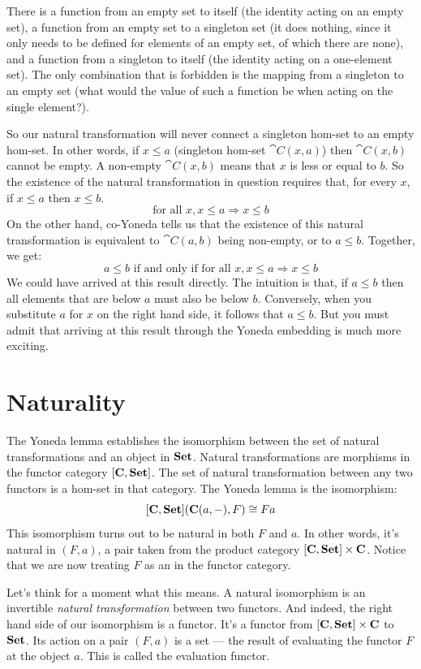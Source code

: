 There is a function from an empty set to itself (the identity acting on
an empty set), a function  from an empty set to a
singleton set (it does nothing, since it only needs to be defined for
elements of an empty set, of which there are none), and a function from
a singleton to itself (the identity acting on a one-element set). The
only combination that is forbidden is the mapping from a singleton to an
empty set (what would the value of such a function be when acting on the
single element?).

So our natural transformation will never connect a singleton hom-set to
an empty hom-set. In other words, if $x \leqslant a$
(singleton hom-set $\cat{C}(x, a)$) then $\cat{C}(x, b)$ cannot be
empty. A non-empty $\cat{C}(x, b)$ means that $x$ is less or
equal to $b$. So the existence of the natural transformation in
question requires that, for every $x$, if
$x \leqslant a$ then $x \leqslant b$.
\[\text{for all } x, x \leqslant a \Rightarrow x \leqslant b\]
On the other hand, co-Yoneda tells us that the existence of this natural
transformation is equivalent to $\cat{C}(a, b)$ being non-empty, or to
$a \leqslant b$. Together, we get:
\[a \leqslant b \text{ if and only if for all } x, x \leqslant a \Rightarrow x \leqslant b\]
We could have arrived at this result directly. The intuition is that, if
$a \leqslant b$ then all elements that are below $a$
must also be below $b$. Conversely, when you substitute
$a$ for $x$ on the right hand side, it follows that
$a \leqslant b$. But you must admit that arriving at this
result through the Yoneda embedding is much more exciting.

\section{Naturality}

The Yoneda lemma establishes the isomorphism between the set of natural
transformations and an object in $\mathbf{Set}$. Natural transformations
are morphisms in the functor category $[\mathbf{C}, \mathbf{Set}]$. The set of
natural transformation between any two functors is a hom-set in that
category. The Yoneda lemma is the isomorphism:
\[[\mathbf{C}, \mathbf{Set}](\mathbf{C}(a, -), F) \cong F a\]
This isomorphism turns out to be natural in both $F$ and
$a$. In other words, it's natural in $(F, a)$, a pair
taken from the product category  $[\mathbf{C}, \mathbf{Set}] \times \mathbf{C}$. Notice
that we are now treating $F$ as an  in the functor
category.

Let's think for a moment what this means. A natural isomorphism is an
invertible \emph{natural transformation} between two functors. And
indeed, the right hand side of our isomorphism is a functor. It's a
functor from $[\mathbf{C}, \mathbf{Set}] \times \mathbf{C}$ to $\mathbf{Set}$. Its action on
a pair $(F, a)$ is a set --- the result of evaluating the
functor $F$ at the object $a$. This is called the
evaluation functor.

